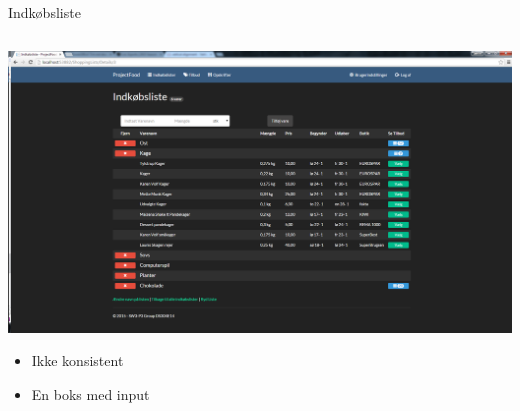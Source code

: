 \begin{frame}{Indkøbsliste}
	\begin{minipage}[0.3\textheight]{\textwidth}
	\begin{columns}[T]
	\begin{column}{1\textwidth}
	 \vspace{-15 pt}
	 \includegraphics[width=1\textwidth,height=1\textheight,keepaspectratio, trim={1cm 0 0 16mm}, clip]{images/Screenshots/ShoppingListOffersOld.png}
	
	\begin{itemize}
		\item Ikke konsistent
		\item En boks med input
	\end{itemize}
	\end{column}

	\end{columns}

  \end{minipage}
	
\end{frame}
